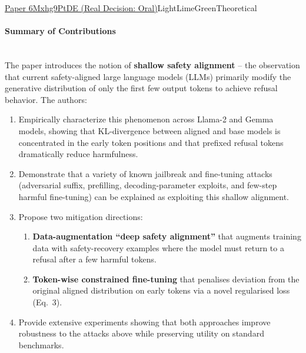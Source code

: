 \documentclass{article} %
\begin{document}
\begin{reviewbox}{\href{https://openreview.net/forum?id=6Mxhg9PtDE}{Paper 6Mxhg9PtDE (Real Decision: Oral)}}{LightLimeGreen}{Theoretical}
\scriptsize

\paragraph{Summary of Contributions}\leavevmode\\[0.1em]
The paper introduces the notion of \textbf{shallow safety alignment} – the observation that current safety-aligned large language models (LLMs) primarily modify the generative distribution of only the first few output tokens to achieve refusal behavior. The authors:

\begin{enumerate}[leftmargin=0.5em, itemsep=0pt, topsep=0pt]
    \item Empirically characterize this phenomenon across Llama-2 and Gemma models, showing that KL-divergence between aligned and base models is concentrated in the early token positions and that prefixed refusal tokens dramatically reduce harmfulness.
    \item Demonstrate that a variety of known jailbreak and fine-tuning attacks (adversarial suffix, prefilling, decoding-parameter exploits, and few-step harmful fine-tuning) can be explained as exploiting this shallow alignment.
    \item Propose two mitigation directions:
    \begin{enumerate}[leftmargin=0.5em, itemsep=0pt, topsep=0pt]
        \item \textbf{Data-augmentation “deep safety alignment”} that augments training data with safety-recovery examples where the model must return to a refusal after a few harmful tokens.
        \item \textbf{Token-wise constrained fine-tuning} that penalises deviation from the original aligned distribution on early tokens via a novel regularised loss (Eq.~3).
    \end{enumerate}
    \item Provide extensive experiments showing that both approaches improve robustness to the attacks above while preserving utility on standard benchmarks.
\end{enumerate}


\end{reviewbox}
\end{document}
